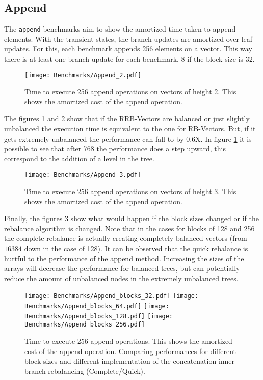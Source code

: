 \subsection{Append}
The \texttt{append} benchmarks aim to show the amortized time taken to append elements. With the transient states, the branch updates are amortized over leaf updates. For this, each benchmark appends 256 elements on a vector. This way there is at least one branch update for each benchmark, 8 if the block size is 32.

\begin{figure}[h!]
  \centering
  \texttt{[image: Benchmarks/Append\_2.pdf]}
  \caption{Time to execute 256 append operations on vectors of height 2. This shows the amortized cost of the append operation.}
  \label{Append2Benchmarks}
\end{figure}

The figures \ref{Append2Benchmarks} and \ref{Append3Benchmarks} show that if the RRB-Vectors are balanced or just slightly unbalanced the execution time is equivalent to the one for RB-Vectors. But, if it gets extremely unbalanced the performance can fall to by 0.6X. In figure \ref{Append2Benchmarks} it is possible to see that after 768 the performance does a step upward, this correspond to the addition of a level in the tree.

\begin{figure}[h!]
  \centering
  \texttt{[image: Benchmarks/Append\_3.pdf]}
  \caption{Time to execute 256 append operations on vectors of height 3. This shows the amortized cost of the append operation.}
   \label{Append3Benchmarks}
\end{figure}

\FloatBarrier

Finally, the figures \ref{AppendBlocksBenchmarks} show what would happen if the block sizes changed or if the rebalance algorithm is changed. Note that in the cases for blocks of 128 and 256 the complete rebalance is actually creating completely balanced vectors (from $16384$ down in the case of 128). It can be observed that the quick rebalance is hurtful to the performance of the append method. Increasing the sizes of the arrays will decrease the performance for balanced trees, but can potentially reduce the amount of unbalanced nodes in the extremely unbalanced trees.

\begin{figure}[h!]
  \centering
  \texttt{[image: Benchmarks/Append\_blocks\_32.pdf]}
  \texttt{[image: Benchmarks/Append\_blocks\_64.pdf]}
  \texttt{[image: Benchmarks/Append\_blocks\_128.pdf]}
  \texttt{[image: Benchmarks/Append\_blocks\_256.pdf]}
  \caption{Time to execute 256 append operations. This shows the amortized cost of the append operation. Comparing performances for different block sizes and different implementation of the concatenation inner branch rebalancing (Complete/Quick).}
  \label{AppendBlocksBenchmarks}
\end{figure}



